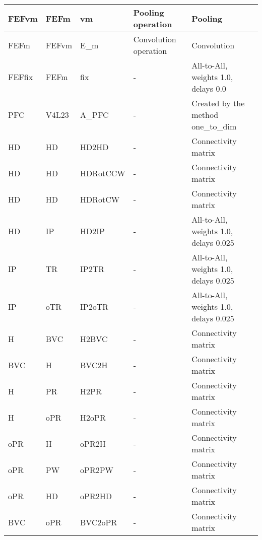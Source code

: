 \documentclass{article}
\begin{document}
\begin{xltabular}{\linewidth}{|l|l|l|X|X|}
    FEFvm & FEFm & vm & Pooling operation &
    Pooling \\ \hline

    FEFm & FEFvm & E_m & Convolution operation &
    Convolution \\ \hline

    FEFfix & FEFm & fix & - &
    All-to-All, weights 1.0, delays 0.0 \\ \hline

    PFC & V4L23 & A\_PFC & - &
    Created by the method one\_to\_dim \\ \hline

    HD & HD & HD2HD & - &
    Connectivity matrix \\ \hline

    HD & HD & HDRotCCW & - &
    Connectivity matrix \\ \hline

    HD & HD & HDRotCW & - &
    Connectivity matrix \\ \hline

    HD & IP & HD2IP & - &
    All-to-All, weights 1.0, delays 0.025 \\ \hline

    IP & TR & IP2TR & - &
    All-to-All, weights 1.0, delays 0.025 \\ \hline

    IP & oTR & IP2oTR & - &
    All-to-All, weights 1.0, delays 0.025 \\ \hline

    H & BVC & H2BVC & - &
    Connectivity matrix \\ \hline

    BVC & H & BVC2H & - &
    Connectivity matrix \\ \hline

    H & PR & H2PR & - &
    Connectivity matrix \\ \hline

    H & oPR & H2oPR & - &
    Connectivity matrix \\ \hline

    oPR & H & oPR2H & - &
    Connectivity matrix \\ \hline

    oPR & PW & oPR2PW & - &
    Connectivity matrix \\ \hline

    oPR & HD & oPR2HD & - &
    Connectivity matrix \\ \hline

    BVC & oPR & BVC2oPR & - &
    Connectivity matrix \\ \hline


\end{xltabular}
\end{document}
